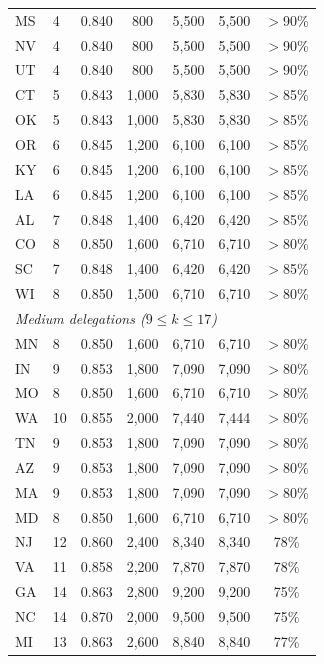 \begin{longtable}{llccccc}
MS &  4 & 0.840 &    800 &    5{,}500 &  5{,}500 & $>$90\% \\
NV &  4 & 0.840 &    800 &    5{,}500 &  5{,}500 & $>$90\% \\
UT &  4 & 0.840 &    800 &    5{,}500 &  5{,}500 & $>$90\% \\
CT &  5 & 0.843 &  1{,}000 &  5{,}830 &  5{,}830 & $>$85\% \\
OK &  5 & 0.843 &  1{,}000 &  5{,}830 &  5{,}830 & $>$85\% \\
OR &  6 & 0.845 &  1{,}200 &  6{,}100 &  6{,}100 & $>$85\% \\
KY &  6 & 0.845 &  1{,}200 &  6{,}100 &  6{,}100 & $>$85\% \\
LA &  6 & 0.845 &  1{,}200 &  6{,}100 &  6{,}100 & $>$85\% \\
AL &  7 & 0.848 &  1{,}400 &  6{,}420 &  6{,}420 & $>$85\% \\
CO &  8 & 0.850 &  1{,}600 &  6{,}710 &  6{,}710 & $>$80\% \\
SC &  7 & 0.848 &  1{,}400 &  6{,}420 &  6{,}420 & $>$85\% \\
WI &  8 & 0.850 &  1{,}500 &  6{,}710 &  6{,}710 & $>$80\% \\
\midrule
\multicolumn{7}{l}{\textit{Medium delegations ($9 \leq k \leq 17$)}} \\
MN &  8 & 0.850 &  1{,}600 &  6{,}710 &  6{,}710 & $>$80\% \\
IN &  9 & 0.853 &  1{,}800 &  7{,}090 &  7{,}090 & $>$80\% \\
MO &  8 & 0.850 &  1{,}600 &  6{,}710 &  6{,}710 & $>$80\% \\
WA & 10 & 0.855 &  2{,}000 &  7{,}440 &  7{,}444 & $>$80\% \\
TN & 9  & 0.853 &  1{,}800 &  7{,}090 &  7{,}090 & $>$80\% \\
AZ & 9  & 0.853 &  1{,}800 &  7{,}090 &  7{,}090 & $>$80\% \\
MA & 9  & 0.853 &  1{,}800 &  7{,}090 &  7{,}090 & $>$80\% \\
MD & 8  & 0.850 &  1{,}600 &  6{,}710 &  6{,}710 & $>$80\% \\
NJ & 12 & 0.860 &  2{,}400 &  8{,}340 &  8{,}340 & 78\% \\
VA & 11 & 0.858 &  2{,}200 &  7{,}870 &  7{,}870 & 78\% \\
GA & 14 & 0.863 &  2{,}800 &  9{,}200 &  9{,}200 & 75\% \\
NC & 14 & 0.870 &  2{,}000 &  9{,}500 &  9{,}500 & 75\% \\
MI & 13 & 0.863 &  2{,}600 &  8{,}840 &  8{,}840 & 77\% \\

\end{longtable}
